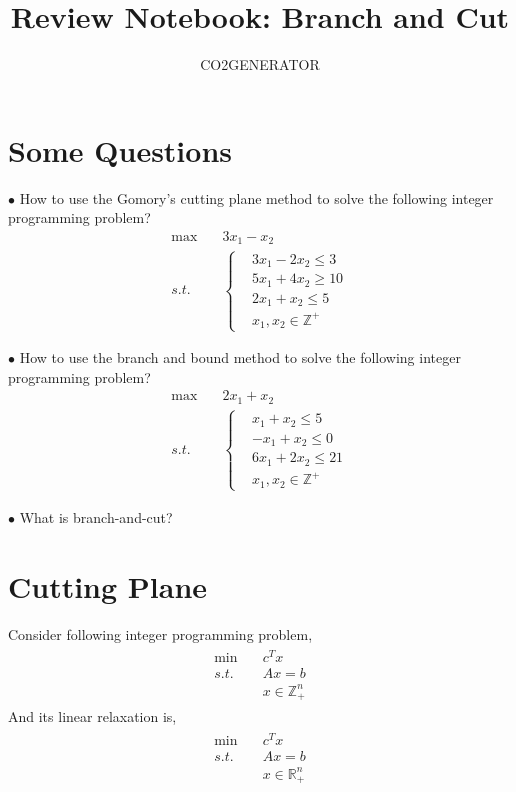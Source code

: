 \documentclass{article}
\title {Review Notebook: Branch and Cut}
\author{CO2GENERATOR}
\begin{document}
\maketitle 
\allowdisplaybreaks[4]

\section{Some Questions}

\noindent $\bullet$ How to use the Gomory's cutting plane method to solve the following integer programming problem?
\begin{align}
	\max \quad & 3x_1 - x_2 \\
	s.t. \quad & \left\{
	\begin{aligned}
		& 3x_1 - 2x_2 \leq 3 \\
		& 5x_1 + 4x_2 \geq 10 \\
		& 2x_1 + x_2 \leq 5 \\
		& x_1, x_2 \in \mathbb{Z}^+
	\end{aligned}\right.
\end{align}

\noindent $\bullet$ How to use the branch and bound method to solve the following integer programming problem?
\begin{align}
	\max \quad & 2x_1 + x_2 \\
	s.t. \quad & \left\{
	\begin{aligned}
		& x_1 + x_2 \leq 5 \\
		& -x_1 + x_2 \leq 0 \\
		& 6x_1 + 2x_2 \leq 21 \\
		& x_1, x_2 \in \mathbb{Z}^+
	\end{aligned}\right.
\end{align}

\noindent $\bullet$ What is branch-and-cut?

\newpage
\section{Cutting Plane}

Consider following integer programming problem,
\begin{align}
\label{problem:ip}
\begin{aligned}
\min \quad & c^Tx \\
s.t. \quad & Ax = b \\
& x \in \mathbb{Z}_+^n
\end{aligned}
\end{align}
And its linear relaxation is,
\begin{align}
\label{linear-relaxation}
\begin{aligned}
\min \quad & c^Tx \\
s.t. \quad & Ax = b \\
& x \in \mathbb{R}_+^n
\end{aligned}
\end{align}
\end{document}
